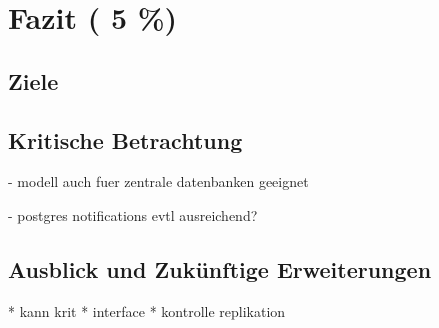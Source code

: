 \chapter{Fazit ( 5 \%)}
\section{Ziele}


\section{Kritische Betrachtung}


- modell auch fuer zentrale datenbanken geeignet

- postgres notifications evtl ausreichend?





\section{Ausblick und Zukünftige Erweiterungen}

* kann krit
* interface
* kontrolle replikation

